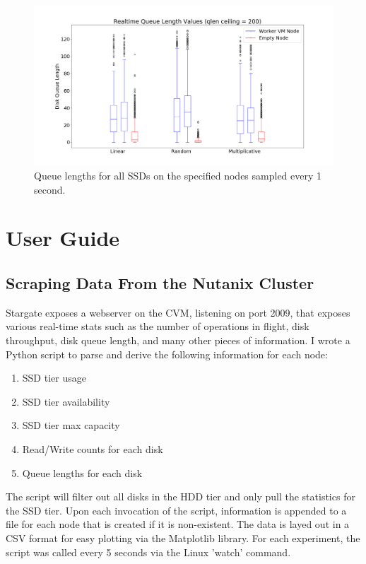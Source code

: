 \documentclass[12pt]{article}
\begin{document}
  \begin{figure}[!htb]
    \centering
    \includegraphics[scale=0.30]{images/qlen_200_box.png} 
    \caption{Queue lengths for all SSDs on the specified nodes sampled every 1
             second.}
    \label{fig:qlen_200}
  \end{figure}

\section{User Guide}

  \subsection{Scraping Data From the Nutanix Cluster}

  Stargate exposes a webserver on the CVM, listening on port 2009, that exposes
  various real-time stats such as the number of operations in flight, disk
  throughput, disk queue length, and many other pieces of information. I wrote
  a Python script to parse and derive the following information for each node:

  \begin{enumerate}
    \item SSD tier usage
    \item SSD tier availability
    \item SSD tier max capacity
    \item Read/Write counts for each disk
    \item Queue lengths for each disk
  \end{enumerate}

  The script will filter out all disks in the HDD tier and only pull the
  statistics for the SSD tier. Upon each invocation of the script, information
  is appended to a file for each node that is created if it is non-existent.
  The data is layed out in a CSV format for easy plotting via the Matplotlib
  library. For each experiment, the script was called every 5 seconds via the
  Linux 'watch' command.
\end{document}
